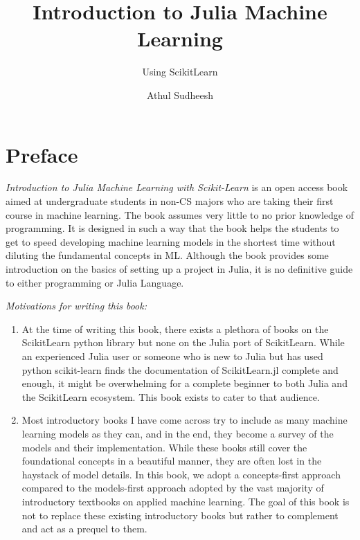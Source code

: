 \documentclass[
  letterpaper,
]{book}
\title{Introduction to Julia Machine Learning}
\subtitle{Using ScikitLearn}
\author{Athul Sudheesh}
\date{}
\begin{document}
\frontmatter
\maketitle

\ifdefined\Shaded\renewenvironment{Shaded}{\begin{tcolorbox}[frame hidden, sharp corners, enhanced, borderline west={3pt}{0pt}{shadecolor}, boxrule=0pt, breakable, interior hidden]}{\end{tcolorbox}}\fi

\mainmatter
\hypertarget{preface}{%
\chapter*{Preface}\label{preface}}

\emph{Introduction to Julia Machine Learning with Scikit-Learn} is an
open access book aimed at undergraduate students in non-CS majors who
are taking their first course in machine learning. The book assumes very
little to no prior knowledge of programming. It is designed in such a
way that the book helps the students to get to speed developing machine
learning models in the shortest time without diluting the fundamental
concepts in ML. Although the book provides some introduction on the
basics of setting up a project in Julia, it is no definitive guide to
either programming or Julia Language.

\emph{Motivations for writing this book:}

\begin{enumerate}
\def\labelenumi{\arabic{enumi}.}
\item
  At the time of writing this book, there exists a plethora of books on
  the ScikitLearn python library but none on the Julia port of
  ScikitLearn. While an experienced Julia user or someone who is new to
  Julia but has used python scikit-learn finds the documentation of
  ScikitLearn.jl complete and enough, it might be overwhelming for a
  complete beginner to both Julia and the ScikitLearn ecosystem. This
  book exists to cater to that audience.
\item
  Most introductory books I have come across try to include as many
  machine learning models as they can, and in the end, they become a
  survey of the models and their implementation. While these books still
  cover the foundational concepts in a beautiful manner, they are often
  lost in the haystack of model details. In this book, we adopt a
  concepts-first approach compared to the models-first approach adopted
  by the vast majority of introductory textbooks on applied machine
  learning. The goal of this book is not to replace these existing
  introductory books but rather to complement and act as a prequel to
  them.
\end{enumerate}
\end{document}
